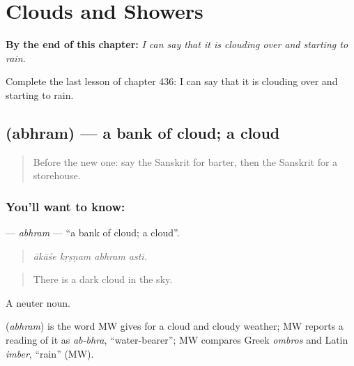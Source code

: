 
\chapter{Clouds and Showers}
\label{ch:sa-clouds-and-showers}

\begin{chapteropening}
\textbf{By the end of this chapter:} \emph{I can say that it is clouding over and starting to rain.}

Complete the last lesson of chapter 436: I can say that it is clouding over and starting to rain.
\end{chapteropening}

\section[\texorpdfstring{\sk{अभ्रम्} (abhram)}{अभ्रम् (abhram)}]{ (abhram) — a bank of cloud; a cloud}

\label{lesson:SA-C436-abhram}



\begin{quote}
Before the new one: say the Sanskrit for barter, then the Sanskrit for a storehouse.
\end{quote}

\subsection*{You'll want to know: }
\textbf{} — \emph{abhram} — \textquotedblleft{}a bank of cloud; a cloud\textquotedblright{}.

\begin{quote}
   
\end{quote}

\begin{quote}
\emph{ākāśe kṛṣṇam abhram asti.}
\end{quote}

\begin{quote}
There is a dark cloud in the sky.
\end{quote}

A neuter noun.

\begin{cousinweb}
\textbf{} (\emph{abhram}) is the word MW gives for a cloud and cloudy weather; MW reports a reading of it as \emph{ab-bhra}, \textquotedblleft{}water-bearer\textquotedblright{}; MW compares Greek \emph{ombros} and Latin \emph{imber}, \textquotedblleft{}rain\textquotedblright{} (MW).
\end{cousinweb}

